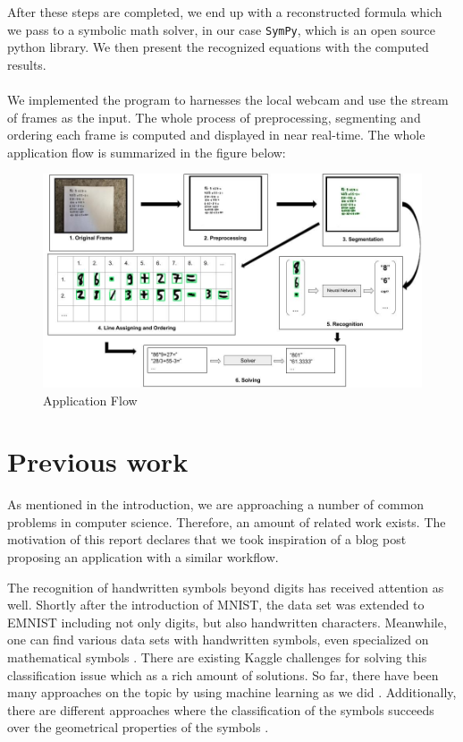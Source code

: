 \documentclass[11pt]{article}
\begin{document}
	After these steps are completed, we end up with a reconstructed formula which we pass to a symbolic math solver, in our case \texttt{SymPy}, which is an open source python library. We then present the recognized equations with the computed results.\\\\
	We implemented the program to harnesses the local webcam and use the stream of frames as the input. The whole process of preprocessing, segmenting and ordering each frame is computed and displayed in near real-time.
	The whole application flow is summarized in the figure below:
	\begin{figure}[h]
		\includegraphics[width=1\textwidth]{ImagesForReport/fulldiagram.jpg}
		\caption{Application Flow}
		\label{fig:FullFlow}
	\end{figure}

	\pagebreak\section{Previous work}
	As mentioned in the introduction, we are approaching a number of common problems in computer science. Therefore, an amount of related work exists. The motivation of this report declares that we took inspiration of a blog post \cite{inspired-blog} proposing an application with a similar workflow. 
	
	The recognition of handwritten symbols beyond digits has received attention as well. Shortly after the introduction of MNIST, the data set was extended to EMNIST \cite{emnist} including not only digits, but also handwritten characters. Meanwhile, one can find various data sets with handwritten symbols, even specialized on mathematical symbols \cite{chajri2016}. There are existing Kaggle challenges for solving this classification issue \cite{kaggle} which as a rich amount of solutions. So far, there have been many approaches on the topic by using machine learning as we did \cite{ramadhan2016} \cite{lee2016}. Additionally, there are different approaches where the classification of the symbols succeeds over the geometrical properties of the symbols \cite{golubitsky2010}. 
	
\end{document}

